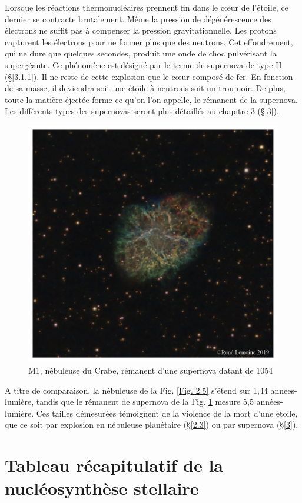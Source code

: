 Lorsque les réactions thermonucléaires prennent fin dans le cœur de l’étoile, ce dernier se contracte brutalement. Même la pression de dégénérescence des électrons ne suffit pas à compenser la pression gravitationnelle. Les protons capturent les électrons pour ne former plus que des neutrons. Cet effondrement, qui ne dure que quelques secondes, produit une onde de choc pulvérisant la supergéante. Ce phénomène est désigné par le terme de supernova de type II (§\ref{3.1.1}). Il ne reste de cette explosion que le cœur composé de fer. En fonction de sa masse, il deviendra soit une étoile à neutrons soit un trou noir. De plus, toute la matière éjectée forme ce qu’on l’on appelle, le rémanent de la supernova. Les différents types des supernovas seront plus détaillés au chapitre 3 (§\ref{3}).

\begin{figure}[H]
	\centering
	\includegraphics[scale=0.3]{images/m1}
	\caption[M1, nébuleuse du Crabe - astrophoto prise par René Lemoine le 29 janvier 2019 avec un Celestron 8 (6h de pose)]{M1, nébuleuse du Crabe, rémanent d'une supernova datant de 1054}
	\label{Fig. 2.7}
\end{figure}

A titre de comparaison, la nébuleuse de la Fig. \ref{Fig. 2.5} s'étend sur 1,44 années-lumière, tandis que le rémanent de supernova de la Fig. \ref{Fig. 2.7} mesure 5,5 années-lumière. Ces tailles démesurées témoignent de la violence de la mort d'une étoile, que ce soit par explosion en nébuleuse planétaire (§\ref{2.3}) ou par supernova (§\ref{3}). 

\section{Tableau récapitulatif de la nucléosynthèse stellaire}\label{2.5}


